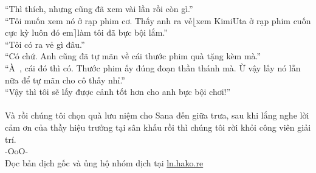 \documentclass[12pt,a4paper, twosides]{book}
\begin{document}
“Thì thích, nhưng cũng đã xem vài lần rồi còn gì.”\\
“Tôi muốn xem nó ở rạp phim cơ. Thấy anh ra vẻ$\lfloor$xem KimiUta ở rạp phim cuốn cực kỳ luôn đó em$\rceil$làm tôi đã bực bội lắm.”\\
“Tôi có ra vẻ gì đâu.”\\
“Có chứ. Anh cũng đã tự mãn về cái thước phim quà tặng kèm mà.”\\
“À~, cái đó thì có. Thước phim ấy đúng đoạn thần thánh mà. Ừ vậy lấy nó lẫn nữa để tự mãn cho cô thấy nhỉ.”\\
“Vậy thì tôi sẽ lấy được cảnh tốt hơn cho anh bực bội chơi!”\\
\\
Và rồi chúng tôi chọn quà lưu niệm cho Sana đến giữa trưa, sau khi lắng nghe lời cảm ơn của thầy hiệu trưởng tại sân khấu rồi thì chúng tôi rời khỏi công viên giải trí.\\
-OoO-\\
Đọc bản dịch gốc và ủng hộ nhóm dịch tại \href{https://ln.hako.re/}{ln.hako.re}\\
\newpage
\end{document}
